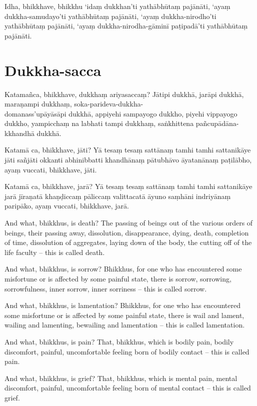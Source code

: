 Idha, bhikkhave, bhikkhu ‘idaṃ dukkhan’ti yathābhūtaṃ pajānāti, ‘ayaṃ
dukkha-samudayo’ti yathābhūtaṃ pajānāti, ‘ayaṃ dukkha-nirodho’ti yathābhūtaṃ
pajānāti, ‘ayaṃ dukkha-nirodha-gāminī paṭipadā’ti yathābhūtaṃ pajānāti.

\section*{Dukkha-sacca}

Katamañca, bhikkhave, dukkhaṃ ariyasaccaṃ? Jātipi dukkhā, jarāpi dukkhā,
maraṇampi dukkhaṃ, soka-parideva-dukkha-\\ domanass'upāyāsāpi dukkhā, appiyehi
sampayogo dukkho, piyehi vippayogo dukkho, yampicchaṃ na labhati tampi dukkhaṃ,
saṅkhittena pañcupādāna-kkhandhā dukkhā.

Katamā ca, bhikkhave, jāti? Yā tesaṃ tesaṃ sattānaṃ tamhi tamhi sattanikāye jāti
sañjāti okkanti abhinibbatti khandhānaṃ pātubhāvo āyatanānaṃ paṭilābho, ayaṃ
vuccati, bhikkhave, jāti.

Katamā ca, bhikkhave, jarā? Yā tesaṃ tesaṃ sattānaṃ tamhi tamhi sattanikāye jarā
jīraṇatā khaṇḍiccaṃ pāliccaṃ valittacatā āyuno saṃhāni indriyānaṃ paripāko, ayaṃ
vuccati, bhikkhave, jarā.

\englishPage

And what, bhikkhus, is death? The passing of beings out of the various orders of
beings, their passing away, dissolution, disappearance, dying, death, completion
of time, dissolution of aggregates, laying down of the body, the cutting off of
the life faculty -- this is called death.

And what, bhikkhus, is sorrow? Bhikkhus, for one who has encountered some
misfortune or is affected by some painful state, there is sorrow, sorrowing,
sorrowfulness, inner sorrow, inner sorriness -- this is called sorrow.

And what, bhikkhus, is lamentation? Bhikkhus, for one who has encountered some
misfortune or is affected by some painful state, there is wail and lament,
wailing and lamenting, bewailing and lamentation -- this is called lamentation.

And what, bhikkhus, is pain? That, bhikkhus, which is bodily pain, bodily
discomfort, painful, uncomfortable feeling born of bodily contact -- this is
called pain.

And what, bhikkhus, is grief? That, bhikkhus, which is mental pain, mental
discomfort, painful, uncomfortable feeling born of mental contact -- this is
called grief.

